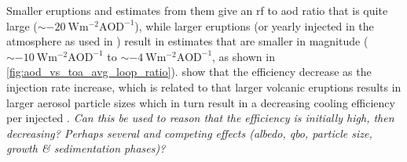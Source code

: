 \documentclass{ametsocV5}
\newcommand{\iso}[1][i]{{#1}njected \ce{SO2}}
\begin{document}

Smaller eruptions and estimates from them give an \ac{rf} to \ac{aod} ratio that is
quite large (\(\sim \SI{-20}{\watt\metre^{-2}\mathrm{AOD}^{-1}}\)), while larger
eruptions (or yearly \iso{} in the atmosphere as used in \citet{niemeier2015}) result in
estimates that are smaller in magnitude (\(\sim
\SI{-10}{\watt\metre^{-2}\mathrm{AOD}^{-1}}\) to \(\sim
\SI{-4}{\watt\metre^{-2}\mathrm{AOD}^{-1}}\), as shown in
\cref{fig:aod_vs_toa_avg_loop_ratio}). \citet{niemeier2017} show that the efficiency
decrease as the injection rate increase, which is related to
that larger volcanic eruptions results in larger aerosol particle sizes which in turn
result in a decreasing cooling efficiency per \iso{} \citep{english2013, timmreck2018}.
\emph{Can this be used to reason that the efficiency is initially high, then decreasing?
  Perhaps several and competing effects (albedo, \ac{qbo}, particle size, growth \&
  sedimentation phases)?}
\end{document}
